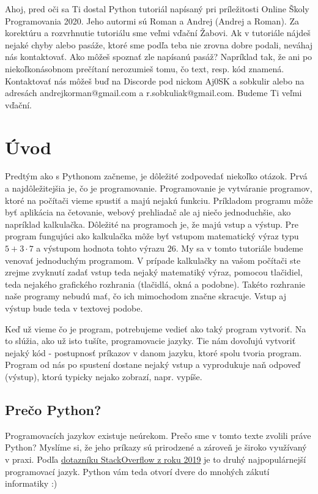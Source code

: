 \documentclass{article}
\begin{document}
\tableofcontents
\newpage

Ahoj, pred oči sa Ti dostal Python tutoriál napísaný pri príležitosti Online Školy Programovania 2020. Jeho autormi sú Roman a Andrej (Andrej a Roman). Za korektúru a rozvrhnutie tutoriálu sme veľmi vďační Žabovi. Ak v tutoriále nájdeš nejaké chyby alebo pasáže, ktoré sme podľa teba nie zrovna dobre podali, neváhaj nás kontaktovať. Ako môžeš spoznať zle napísanú pasáž? Napríklad tak, že ani po niekoľkonásobnom prečítaní nerozumieš tomu, čo text, resp. kód znamená. Kontaktovať nás môžeš buď na Discorde pod nickom Aj0SK a sobkulir alebo na adresách andrejkorman@gmail.com a r.sobkuliak@gmail.com. Budeme Ti veľmi vďační.

\section{Úvod}
Predtým ako s Pythonom začneme, je dôležité zodpovedať niekoľko otázok. Prvá a najdôležitejšia je, čo je programovanie. Programovanie je vytváranie programov, ktoré na počítači vieme spustiť a majú nejakú funkciu. Príkladom programu môže byť aplikácia na četovanie, webový prehliadač ale aj niečo jednoduchšie, ako napríklad kalkulačka. Dôležité na programoch je, že majú vstup a výstup. Pre program fungujúci ako kalkulačka môže byť vstupom matematický výraz typu $5+3\cdot 7$ a výstupom hodnota tohto výrazu $26$. My sa v tomto tutoriále budeme venovať jednoduchým programom. V prípade kalkulačky na vašom počítači ste zrejme zvyknutí zadať vstup teda nejaký matematiký výraz, pomocou tlačidiel, teda nejakého grafického rozhrania (tlačidlá, okná a podobne). Takéto rozhranie naše programy nebudú mať, čo ich mimochodom značne skracuje. Vstup aj výstup bude teda v textovej podobe.

Keď už vieme čo je program, potrebujeme vedieť ako taký program vytvoriť. Na to slúžia, ako už isto tušíte, programovacie jazyky. Tie nám dovoľujú vytvoriť nejaký kód - postupnosť príkazov v danom jazyku, ktoré spolu tvoria program. Program od nás po spustení dostane nejaký vstup a vyprodukuje naň odpoveď (výstup), ktorú typicky nejako zobrazí, napr. vypíše.

\subsection{Prečo Python?}
Programovacích jazykov existuje neúrekom. Prečo sme v tomto texte zvolili práve Python? Myslíme si, že jeho príkazy sú prirodzené a zároveň je široko využívaný v praxi. Podľa \href{https://insights.stackoverflow.com/survey/2019#technology-_-programming-scripting-and-markup-languages}{dotazníku StackOverflow z roku 2019} je to druhý najpopulárnejší programovací jazyk. Python vám teda otvorí dvere do mnohých zákutí informatiky :)
\end{document}
